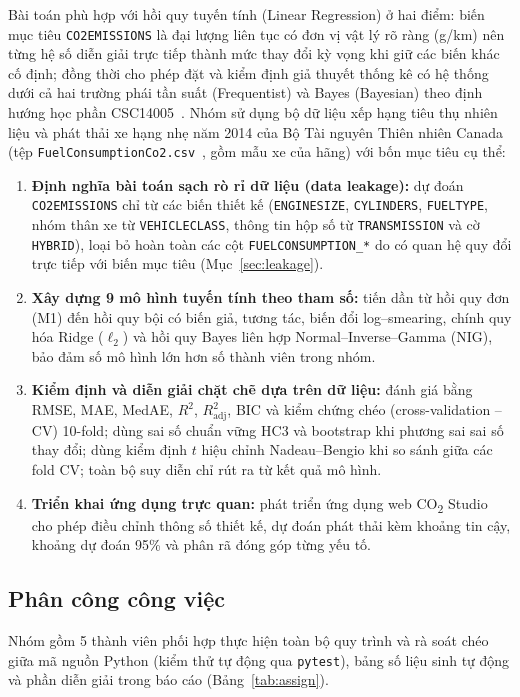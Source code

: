 Bài toán phù hợp với hồi quy tuyến tính (Linear Regression) ở hai điểm: biến mục tiêu \texttt{CO2EMISSIONS} là đại lượng liên tục có đơn vị vật lý rõ ràng (g/km) nên từng hệ số diễn giải trực tiếp thành mức thay đổi kỳ vọng khi giữ các biến khác cố định; đồng thời cho phép đặt và kiểm định giả thuyết thống kê có hệ thống dưới cả hai trường phái tần suất (Frequentist) và Bayes (Bayesian) theo định hướng học phần CSC14005~\cite{len2023phantichdulieu, bishop2006prml}. Nhóm sử dụng bộ dữ liệu xếp hạng tiêu thụ nhiên liệu và phát thải xe hạng nhẹ năm 2014 của Bộ Tài nguyên Thiên nhiên Canada~\cite{nrcan2014fuel} (tệp \texttt{FuelConsumptionCo2.csv}~\cite{ibm2014fuelco2}, gồm \nCars{} mẫu xe của \nMakes{} hãng) với bốn mục tiêu cụ thể:
\begin{enumerate}
  \item \textbf{Định nghĩa bài toán sạch rò rỉ dữ liệu (data leakage):} dự đoán \texttt{CO2EMISSIONS} chỉ từ các biến thiết kế (\texttt{ENGINESIZE}, \texttt{CYLINDERS}, \texttt{FUELTYPE}, nhóm thân xe từ \texttt{VEHICLECLASS}, thông tin hộp số từ \texttt{TRANSMISSION} và cờ \texttt{HYBRID}), loại bỏ hoàn toàn các cột \texttt{FUELCONSUMPTION\_*} do có quan hệ quy đổi trực tiếp với biến mục tiêu (Mục~\ref{sec:leakage}).
  \item \textbf{Xây dựng 9 mô hình tuyến tính theo tham số:} tiến dần từ hồi quy đơn (M1) đến hồi quy bội có biến giả, tương tác, biến đổi log--smearing, chính quy hóa Ridge ($\ell_2$) và hồi quy Bayes liên hợp Normal--Inverse--Gamma (NIG), bảo đảm số mô hình lớn hơn số thành viên trong nhóm.
  \item \textbf{Kiểm định và diễn giải chặt chẽ dựa trên dữ liệu:} đánh giá bằng RMSE, MAE, MedAE, $R^2$, $R^2_{\mathrm{adj}}$, BIC và kiểm chứng chéo (cross-validation -- CV) 10-fold; dùng sai số chuẩn vững HC3 và bootstrap khi phương sai sai số thay đổi; dùng kiểm định $t$ hiệu chỉnh Nadeau--Bengio khi so sánh giữa các fold CV; toàn bộ suy diễn chỉ rút ra từ kết quả mô hình.
  \item \textbf{Triển khai ứng dụng trực quan:} phát triển ứng dụng web CO\textsubscript{2} Studio cho phép điều chỉnh thông số thiết kế, dự đoán phát thải kèm khoảng tin cậy, khoảng dự đoán 95\% và phân rã đóng góp từng yếu tố.
\end{enumerate}

\subsection{Phân công công việc}
Nhóm gồm 5 thành viên phối hợp thực hiện toàn bộ quy trình và rà soát chéo giữa mã nguồn Python (kiểm thử tự động qua \texttt{pytest}), bảng số liệu sinh tự động và phần diễn giải trong báo cáo (Bảng~\ref{tab:assign}).

